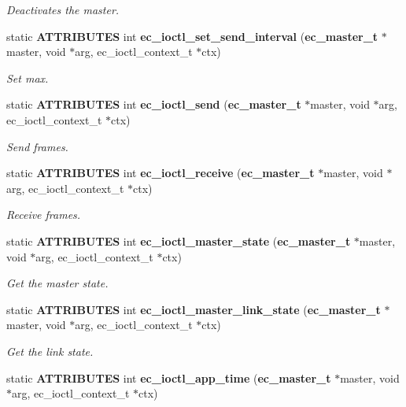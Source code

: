 \begin{DoxyCompactItemize}
\begin{DoxyCompactList}\small\item\em Deactivates the master. \end{DoxyCompactList}\item 
static {\bf A\-T\-T\-R\-I\-B\-U\-T\-E\-S} int {\bf ec\-\_\-ioctl\-\_\-set\-\_\-send\-\_\-interval} ({\bf ec\-\_\-master\-\_\-t} $\ast$master, void $\ast$arg, ec\-\_\-ioctl\-\_\-context\-\_\-t $\ast$ctx)
\begin{DoxyCompactList}\small\item\em Set max. \end{DoxyCompactList}\item 
static {\bf A\-T\-T\-R\-I\-B\-U\-T\-E\-S} int {\bf ec\-\_\-ioctl\-\_\-send} ({\bf ec\-\_\-master\-\_\-t} $\ast$master, void $\ast$arg, ec\-\_\-ioctl\-\_\-context\-\_\-t $\ast$ctx)
\begin{DoxyCompactList}\small\item\em Send frames. \end{DoxyCompactList}\item 
static {\bf A\-T\-T\-R\-I\-B\-U\-T\-E\-S} int {\bf ec\-\_\-ioctl\-\_\-receive} ({\bf ec\-\_\-master\-\_\-t} $\ast$master, void $\ast$arg, ec\-\_\-ioctl\-\_\-context\-\_\-t $\ast$ctx)
\begin{DoxyCompactList}\small\item\em Receive frames. \end{DoxyCompactList}\item 
static {\bf A\-T\-T\-R\-I\-B\-U\-T\-E\-S} int {\bf ec\-\_\-ioctl\-\_\-master\-\_\-state} ({\bf ec\-\_\-master\-\_\-t} $\ast$master, void $\ast$arg, ec\-\_\-ioctl\-\_\-context\-\_\-t $\ast$ctx)
\begin{DoxyCompactList}\small\item\em Get the master state. \end{DoxyCompactList}\item 
static {\bf A\-T\-T\-R\-I\-B\-U\-T\-E\-S} int {\bf ec\-\_\-ioctl\-\_\-master\-\_\-link\-\_\-state} ({\bf ec\-\_\-master\-\_\-t} $\ast$master, void $\ast$arg, ec\-\_\-ioctl\-\_\-context\-\_\-t $\ast$ctx)
\begin{DoxyCompactList}\small\item\em Get the link state. \end{DoxyCompactList}\item 
static {\bf A\-T\-T\-R\-I\-B\-U\-T\-E\-S} int {\bf ec\-\_\-ioctl\-\_\-app\-\_\-time} ({\bf ec\-\_\-master\-\_\-t} $\ast$master, void $\ast$arg, ec\-\_\-ioctl\-\_\-context\-\_\-t $\ast$ctx)

\end{DoxyCompactItemize}
